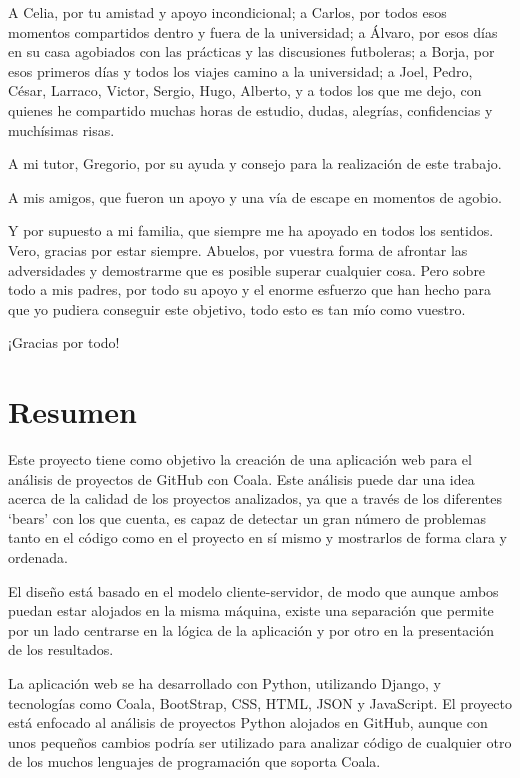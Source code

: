 \documentclass[a4paper, 12pt]{book}
\begin{document}
A Celia, por tu amistad y apoyo incondicional; a Carlos, por todos esos momentos compartidos dentro y fuera de la universidad; a Álvaro, por esos días en su casa agobiados con las prácticas y las discusiones futboleras; a Borja, por esos primeros días y todos los viajes camino a la universidad; a Joel, Pedro, César, Larraco, Victor, Sergio, Hugo, Alberto, y a todos los que me dejo, con quienes he compartido muchas horas de estudio, dudas, alegrías, confidencias y muchísimas risas.

A mi tutor, Gregorio, por su ayuda y consejo para la realización de este trabajo.

A mis amigos, que fueron un apoyo y una vía de escape en momentos de agobio.

Y por supuesto a mi familia, que siempre me ha apoyado en todos los sentidos. Vero, gracias por estar siempre. Abuelos, por vuestra forma de afrontar las adversidades y demostrarme que es posible superar cualquier cosa. Pero sobre todo a mis padres, por todo su apoyo y el enorme esfuerzo que han hecho para que yo pudiera conseguir este objetivo, todo esto es tan mío como vuestro.

¡Gracias por todo!


\chapter*{Resumen}

Este proyecto tiene como objetivo la creación de una aplicación web para el análisis de
proyectos de GitHub con Coala. Este análisis puede dar una idea acerca de la calidad de
los proyectos analizados, ya que a través de los diferentes `bears' con los que cuenta, es
capaz de detectar un gran número de problemas tanto en el código como en el proyecto en sí mismo
y mostrarlos de forma clara y ordenada.

El diseño está basado en el modelo cliente-servidor, de modo que aunque ambos puedan estar
alojados en la misma máquina, existe una separación que permite por un lado centrarse en la
lógica de la aplicación y por otro en la presentación de los resultados.

La aplicación web se ha desarrollado con Python, utilizando Django, y tecnologías como Coala, 
BootStrap, CSS, HTML, JSON y JavaScript. El proyecto está enfocado al análisis de proyectos 
Python alojados en GitHub, aunque con unos pequeños cambios podría ser utilizado para analizar 
código de cualquier otro de los muchos lenguajes de programación que soporta Coala.
\end{document}
